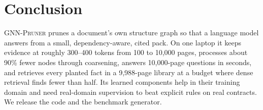 \documentclass[11pt]{article}
\newcommand{\system}{\textsc{GNN-Pruner}}
\begin{document}
\section{Conclusion}

\system{} prunes a document's own structure graph so that a language model answers from a small, dependency-aware, cited pack. On one laptop it keeps evidence at roughly 300--400 tokens from 100 to 10,000 pages, processes about 90\% fewer nodes through coarsening, answers 10,000-page questions in seconds, and retrieves every planted fact in a 9,988-page library at a budget where dense retrieval finds fewer than half. Its learned components help in their training domain and need real-domain supervision to beat explicit rules on real contracts. We release the code and the benchmark generator.


\end{document}
